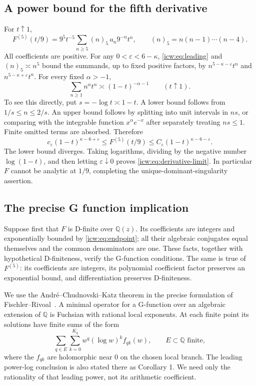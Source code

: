 \documentclass[11pt,letterpaper]{article}
\theoremstyle{remark}\newtheorem{remark}[theorem]{Remark}
\newcommand{\QQ}{\mathbb Q}
\newcommand{\eps}{\varepsilon}
\newcommand{\1}{\mathbf1}
\begin{document}
\subsection{A power bound for the fifth derivative}
For $t\uparrow1$,
\[
 F^{(5)}(t/9)=9^5t^{-5}\sum_{n\ge5}(n)_5\,a_n9^{-n}t^n,
 \qquad (n)_5=n(n-1)\cdots(n-4).
\]
All coefficients are positive. For any
$0<\eps<6-\kappa$, \eqref{icw:eq:leading} and $(n)_5\asymp n^5$ bound
the summands, up to fixed positive factors, by
$n^{5-\kappa-\eps}t^n$ and $n^{5-\kappa+\eps}t^n$.
For every fixed $\alpha>-1$,
\begin{equation}\label{icw:eq:abelian}
 \sum_{n\ge1}n^\alpha t^n\asymp(1-t)^{-\alpha-1}
 \qquad(t\uparrow1).
\end{equation}
To see this directly, put $s=-\log t\asymp1-t$. A lower bound follows
from $1/s\le n\le2/s$. An upper bound follows by splitting into unit
intervals in $ns$, or comparing with the integrable function
$x^\alpha e^{-x}$ after separately treating $ns\le1$.
Finite omitted terms are absorbed. Therefore
\begin{equation}\label{icw:eq:5bound}
 c_\eps(1-t)^{\kappa-6+\eps}
 \le F^{(5)}(t/9)
 \le C_\eps(1-t)^{\kappa-6-\eps}.
\end{equation}
The lower bound diverges. Taking logarithms, dividing by the negative
number $\log(1-t)$, and then letting $\eps\downarrow0$ proves
\eqref{icw:eq:derivative-limit}. In particular $F$ cannot be analytic at
$1/9$, completing the unique-dominant-singularity assertion.

\subsection{The precise G function implication}
Suppose first that $F$ is D-finite over $\QQ(z)$. Its coefficients are
integers and exponentially bounded by \eqref{icw:eq:endpoint}; all their
algebraic conjugates equal themselves and the common denominators are
one. These facts, together with hypothetical D-finiteness, verify the
G-function conditions. The same is true of $F^{(5)}$: its coefficients
are integers, its polynomial coefficient factor preserves an exponential
bound, and differentiation preserves D-finiteness.

We use the Andr\'e--Chudnovski--Katz theorem in the precise formulation
of Fischler--Rivoal~\cite[Theorem 6, pp.~328--329]{fr}. A minimal
operator for a G-function over an algebraic extension of $\QQ$ is
Fuchsian with rational local exponents. At each finite point its
solutions have finite sums of the form
\begin{equation}\label{icw:eq:powerlog}
 \sum_{q\in E}\sum_{k=0}^{K_q}w^q(\log w)^k f_{qk}(w),
 \qquad E\subset\QQ\text{ finite},
\end{equation}
where the $f_{qk}$ are holomorphic near $0$ on the chosen local branch.
The leading power-log conclusion is also stated there as Corollary 1.
We need only the rationality of that leading power, not its arithmetic
coefficient.
\end{document}
